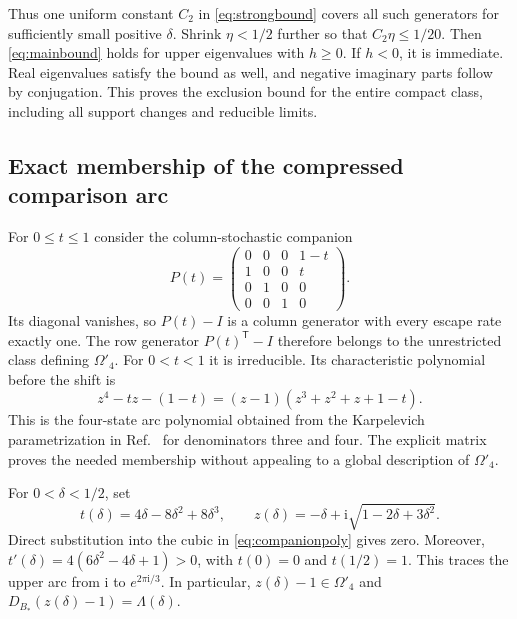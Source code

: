 \documentclass[11pt,a4paper]{article}
\newcommand{\ii}{\mathrm i}
\newcommand{\Bstar}{B_*}
\newcommand{\trans}{^{\mathsf T}}
\begin{document}
Thus one uniform constant $C_2$ in \eqref{eq:strongbound} covers all
such generators for sufficiently small positive $\delta$. Shrink
$\eta<1/2$ further so that $C_2\eta\leq1/20$.
Then \eqref{eq:mainbound} holds for upper eigenvalues with $h\geq0$.
If $h<0$, it is immediate. Real eigenvalues satisfy the bound as well,
and negative imaginary parts follow by conjugation. This proves
the exclusion bound for the entire compact class, including all
support changes and reducible limits.

\subsection{Exact membership of the compressed comparison arc}

For $0\leq t\leq1$ consider the column-stochastic companion
\begin{equation}\label{eq:companion}
 P(t)=\begin{pmatrix}
 0&0&0&1-t\\
 1&0&0&t\\
 0&1&0&0\\
 0&0&1&0
 \end{pmatrix}.
\end{equation}
Its diagonal vanishes, so $P(t)-I$ is a column generator with every
escape rate exactly one. The row generator $P(t)\trans-I$ therefore
belongs to the unrestricted class defining $\Omega'_4$.
For $0<t<1$ it is irreducible. Its characteristic polynomial before
the shift is
\begin{equation}\label{eq:companionpoly}
 z^4-tz-(1-t)=(z-1)(z^3+z^2+z+1-t).
\end{equation}
This is the four-state arc polynomial obtained from the Karpelevich
parametrization in Ref.~\cite[Supplementary Eq.~(S2)]{Xu2025} for
denominators three and four. The explicit matrix proves the needed
membership without appealing to a global description of $\Omega'_4$.

For $0<\delta<1/2$, set
\begin{equation}\label{eq:tandz}
 t(\delta)=4\delta-8\delta^2+8\delta^3,\qquad
 z(\delta)=-\delta+\ii\sqrt{1-2\delta+3\delta^2}.
\end{equation}
Direct substitution into the cubic in \eqref{eq:companionpoly}
gives zero. Moreover,
$t'(\delta)=4(6\delta^2-4\delta+1)>0$, with $t(0)=0$ and
$t(1/2)=1$. This traces the upper arc from $\ii$ to
$e^{2\pi\ii/3}$. In particular, $z(\delta)-1\in\Omega'_4$ and
$D_{\Bstar}(z(\delta)-1)=\Lambda(\delta)$.
\end{document}
